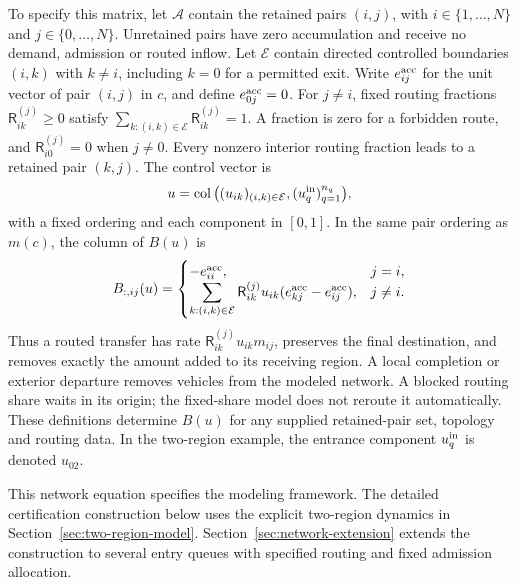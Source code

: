 \documentclass[preprint,12pt]{elsarticle}
\theoremstyle{definition}
\theoremstyle{plain}
\theoremstyle{definition}
\theoremstyle{plain}
\begin{document}
To specify this matrix, let $\mathcal A$ contain the retained pairs
$(i,j)$, with $i\in\{1,\ldots,N\}$ and $j\in\{0,\ldots,N\}$.
Unretained pairs have zero accumulation and receive no demand, admission
or routed inflow. Let $\mathcal E$ contain directed controlled boundaries
$(i,k)$ with $k\ne i$, including $k=0$ for a permitted exit. Write $e_{ij}^{\rm acc}$ for the
unit vector of pair $(i,j)$ in $c$, and define $e_{0j}^{\rm acc}=0$.
For $j\ne i$, fixed routing fractions $\mathsf R_{ik}^{(j)}\ge0$ satisfy
$\sum_{k:(i,k)\in\mathcal E}\mathsf R_{ik}^{(j)}=1$.
A fraction is zero for a forbidden route, and $\mathsf R_{i0}^{(j)}=0$
when $j\ne0$. Every nonzero interior routing fraction leads to a retained
pair $(k,j)$. The control vector is
\[
 u=\operatorname{col}\big((u_{ik})_{(i,k)\in\mathcal E},
                         (u_q^{\rm in})_{q=1}^{n_q}\big),
\]
with a fixed ordering and each component in $[0,1]$. In the same pair
ordering as $m(c)$, the column of $B(u)$ is
\begin{equation}
 B_{:,ij}(u)=
 \begin{cases}
 -e_{ii}^{\rm acc},&j=i,\\
 \displaystyle\sum_{k:(i,k)\in\mathcal E}
 \mathsf R_{ik}^{(j)}u_{ik}(e_{kj}^{\rm acc}-e_{ij}^{\rm acc}),&j\ne i.
 \end{cases}
 \label{eq:network-routing-columns}
\end{equation}
Thus a routed transfer has rate
$\mathsf R_{ik}^{(j)}u_{ik}m_{ij}$, preserves the final destination, and
removes exactly the amount added to its receiving region. A local completion
or exterior departure removes vehicles from the modeled network. A blocked
routing share waits in its origin; the fixed-share model does not reroute
it automatically. These definitions determine $B(u)$ for any supplied
retained-pair set, topology and routing data. In the two-region example,
the entrance component $u_q^{\rm in}$ is denoted $u_{02}$.

This network equation specifies the modeling framework. The detailed
certification construction below uses the explicit two-region dynamics
in Section~\ref{sec:two-region-model}. Section~\ref{sec:network-extension}
extends the construction to several entry queues with specified routing
and fixed admission allocation.
\end{document}
